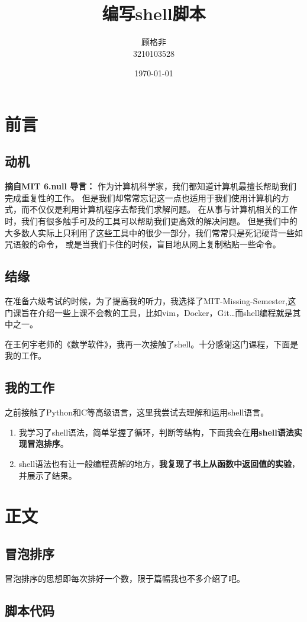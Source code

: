 \documentclass{ctexart}
\title{\vspace{-2cm}编写shell脚本}
\author{顾格非 \\ 3210103528}
\date{\today}
\begin{document}
\maketitle
\section{前言}
\subsection{动机}

\textbf{摘自MIT 6.null 导言： }
作为计算机科学家，我们都知道计算机最擅长帮助我们完成重复性的工作。 但是我们却常常忘记这一点也适用于我们使用计算机的方式，而不仅仅是利用计算机程序去帮我们求解问题。 在从事与计算机相关的工作时，我们有很多触手可及的工具可以帮助我们更高效的解决问题。 但是我们中的大多数人实际上只利用了这些工具中的很少一部分，我们常常只是死记硬背一些如咒语般的命令， 或是当我们卡住的时候，盲目地从网上复制粘贴一些命令。
\subsection{结缘}
在准备六级考试的时候，为了提高我的听力，我选择了MIT-Missing-Semester,这门课旨在介绍一些上课不会教的工具，比如vim，Docker，Git…而shell编程就是其中之一。

在王何宇老师的《数学软件》，我再一次接触了shell。十分感谢这门课程，下面是我的工作。
\subsection{我的工作}
之前接触了Python和C等高级语言，这里我尝试去理解和运用shell语言。
\begin{enumerate}
    \item 我学习了shell语法，简单掌握了循环，判断等结构，下面我会在\textbf{用shell语法实现冒泡排序}。
    \item shell语法也有让一般编程费解的地方，\textbf{我复现了书上从函数中返回值的实验}，并展示了结果。
\end{enumerate}

\section{正文}
\subsection{冒泡排序}
冒泡排序的思想即每次排好一个数，限于篇幅我也不多介绍了吧。
\subsection{脚本代码}
\end{document}

